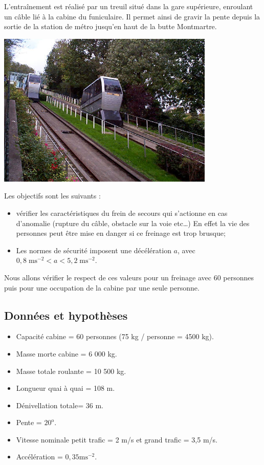 \documentclass[10pt,fleqn]{book} %
\begin{document}
\begin{multicols}{2}
L’entraînement est réalisé par un treuil situé dans la gare supérieure, enroulant un câble lié à la cabine du funiculaire. Il permet ainsi de gravir la pente depuis la sortie de la station de métro jusqu’en haut de la butte Montmartre.
\begin{center}
\includegraphics[width=\linewidth]{images/fig_06}
\end{center}

Les objectifs sont les suivants :
\begin{itemize}
\item vérifier les caractéristiques du frein de secours qui s’actionne en cas d’anomalie (rupture du câble, obstacle sur la voie etc…) En effet la vie des personnes peut être mise en danger si ce freinage est trop brusque;
\item Les normes de sécurité imposent une décélération $a$, avec $0,8\;\text{ms}^{-2}<a<5,2\;\text{ms}^{-2}$.
\end{itemize}

Nous allons vérifier le respect de ces valeurs pour un freinage avec 60 personnes puis pour une occupation de la cabine par une seule personne.

\subsection*{Données et hypothèses}
\begin{itemize}
\item Capacité cabine = 60 personnes (75 kg / personne = 4500 kg).
\item Masse morte cabine = 6 000 kg.
\item Masse totale roulante = 10 500 kg.
\item Longueur quai à quai = 108 m.
\item Dénivellation totale= 36 m.   
\item Pente = $20^{\text{o}}$.
\item Vitesse nominale petit trafic = 2 m/s   et grand trafic = 3,5 m/s.
\item Accélération = $0,35 \text{ms}^{-2}$.
\end{itemize}


\end{multicols}
\end{document}
